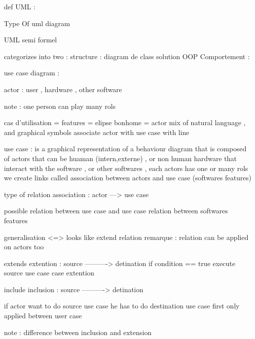 def UML :

Type Of uml diagram


UML semi formel 

categorizes into two :
structure : diagram de class solution OOP 
Comportement :

use case diagram :

actor : user , hardware , other software 

note : 
one person can play many rols 

cas d'utilisation = features = elipse
bonhome = actor
mix of natural language , and graphical symbols
associate actor with use case with line

use case : is a graphical representation of a behaviour diagram
that is composed of actors that can be huaman (intern,externe) , or 
non human hardware that interact with the software , or other softwares
, each actors has one or many rols we create links called association between actors and use case 
(softwares features)

type of relation 
association : actor ---> use case

possible relation between use case and use case
relation between softwares features

generalisation <=> looks like extend relation
remarque : relation can be applied on actors too

                     extends
extention : source ----------> detination
if condition == true execute source use case 
case extention

                     include
inclusion : source ----------> detination

if actor want to do source use case he has to do destination use case first
only applied between user case 

note :
difference between inclusion and extension
